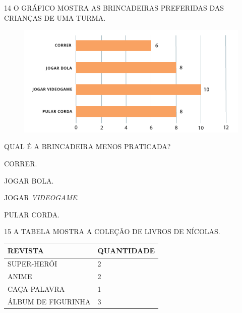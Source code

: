 \num{14} O GRÁFICO MOSTRA AS BRINCADEIRAS PREFERIDAS DAS CRIANÇAS DE UMA TURMA.

\begin{figure}[H]
\includegraphics[width=\textwidth]{./media/SAEB_1ANO_MAT_FIGURA134.png}
\end{figure}

\pagebreak
QUAL É A BRINCADEIRA MENOS PRATICADA?

\begin{escolha}[itemsep=0pt]
\item CORRER.

\item JOGAR BOLA.

\item JOGAR \textit{VIDEOGAME}.

\item PULAR CORDA.
\end{escolha}

\num{15} A TABELA MOSTRA A COLEÇÃO DE LIVROS DE NÍCOLAS.


\begin{table}[!ht]
    \centering
    \begin{tabular}{|l|l|}
    \hline
        \textbf{REVISTA} & \textbf{QUANTIDADE} \\ \hline
        SUPER-HERÓI & 2 \\ \hline
        ANIME & 2 \\ \hline
        CAÇA-PALAVRA & 1 \\ \hline
        ÁLBUM DE FIGURINHA & 3 \\ \hline
    \end{tabular}
\end{table}

